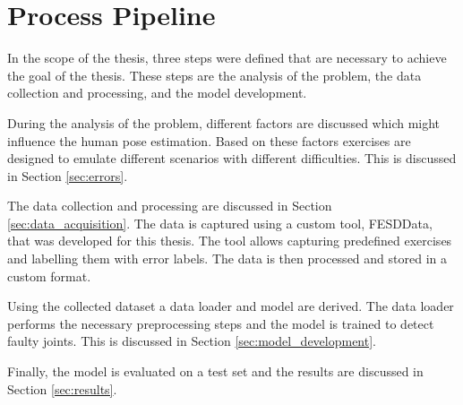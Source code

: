 \section{Process Pipeline}
\label{sec:process_pipeline}

In the scope of the thesis, three steps were defined that are necessary to achieve the goal of the thesis. These steps are the analysis of the problem, the data collection and processing, and the model development.

During the analysis of the problem, different factors are discussed which might influence the human pose estimation. Based on these factors exercises are designed to emulate different scenarios with different difficulties. This is discussed in Section \ref{sec:errors}.

The data collection and processing are discussed in Section \ref{sec:data_acquisition}. The data is captured using a custom tool, FESDData, that was developed for this thesis. The tool allows capturing predefined exercises and labelling them with error labels. The data is then processed and stored in a custom format.

Using the collected dataset a data loader and model are derived. The data loader performs the necessary preprocessing steps and the model is trained to detect faulty joints. This is discussed in Section \ref{sec:model_development}.

Finally, the model is evaluated on a test set and the results are discussed in Section \ref{sec:results}.
